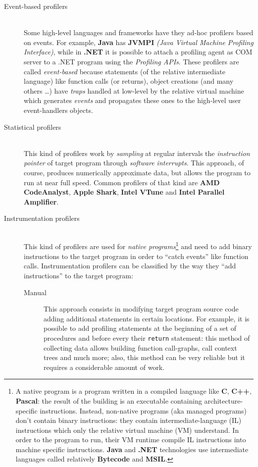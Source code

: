 \documentclass[a4paper,10pt]{report}
\begin{document}
\begin{description}
\item[Event-based profilers] \hfill \\
Some high-level languages and frameworks have they ad-hoc profilers based on
events. For example, \textbf{Java} has \textbf{JVMPI} \textit{(Java Virtual
Machine Profiling Interface)}, while in \textbf{.NET} it is possible to attach a
profiling agent as COM server to a .NET program using the \emph{Profiling APIs}.
These profilers are called \emph{event-based} because statements (of the
relative intermediate language) like function calls (or returns), object
creations (and many others \ldots) have \emph{traps} handled at low-level by the
relative virtual machine which generates \emph{events} and propagates these ones
to the high-level user event-handlers objects.

\item[Statistical profilers] \hfill \\
This kind of profilers work by \emph{sampling} at regular intervals the
\emph{instruction pointer} of target program through \emph{software interrupts}.
This approach, of course, produces numerically approximate data, but allows the
program to run at near full speed. Common profilers of that kind are \textbf{AMD
CodeAnalyst}, \textbf{Apple Shark}, \textbf{Intel VTune} and \textbf{Intel
Parallel Amplifier}.

\item[Instrumentation profilers] \hfill \\
This kind of profilers are used for \emph{native programs}\footnote{A native
program is a program written in a compiled language like \textbf{C},
\textbf{C++}, \textbf{Pascal}: the result of the building is an executable
containing architecture-specific instructions. Instead, non-native programs (aka
managed programs) don't contain binary instructions: they contain
intermediate-language (IL) instructions which only the relative virtual machine
(VM) understand. In order to the program to run, their VM runtime compile IL
instructions into machine specific instructions. \textbf{Java} and \textbf{.NET}
technologies use intermediate languages called relatively \textbf{Bytecode} and
\textbf{MSIL}.} and need to add binary instructions to the target program in
order to ``catch events'' like function calls. Instrumentation profilers can be
classified by the way they ``add instructions'' to the target program:

\begin{description}
\item[Manual]
This approach consists in modifying target program source code adding additional
statements in certain locations. For example, it is possible to add profiling
statements at the beginning of a set of procedures and before every their
\verb|return| statement: this method of collecting data allows building function
call-graphs, call context trees and much more; also, this method can be very
reliable but it requires a considerable amount of work.


\end{description}
\end{description}
\end{document}
